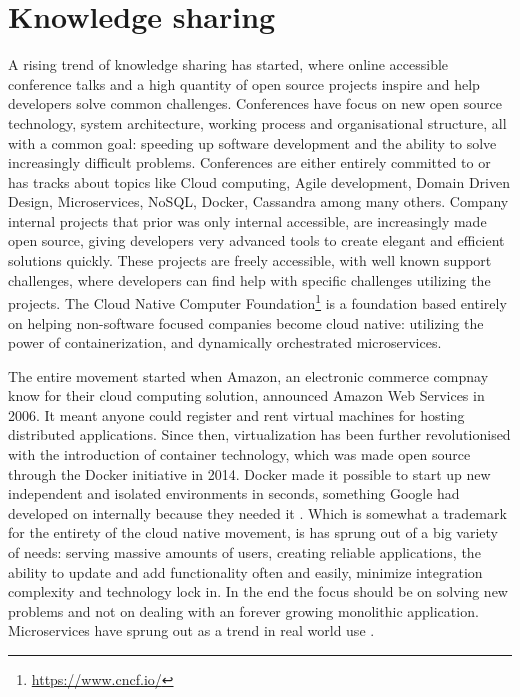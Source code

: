 \section{Knowledge sharing}
A rising trend of knowledge sharing has started, where online accessible conference talks and a high quantity of open source projects inspire and help developers solve common challenges. Conferences have focus on new open source technology, system architecture, working process and organisational structure, all with a common goal: speeding up software development and the ability to solve increasingly difficult problems. Conferences are either entirely committed to or has tracks about topics like Cloud computing, Agile development, Domain Driven Design, Microservices, NoSQL, Docker, Cassandra among many others\cite{george2016it}. Company internal projects that prior was only internal accessible, are increasingly made open source, giving developers very advanced tools to create elegant and efficient solutions quickly. These projects are freely accessible, with well known support challenges, where developers can find help with specific challenges utilizing the projects. The Cloud Native Computer Foundation\footnote{\url{https://www.cncf.io/}} is a foundation based entirely on helping non-software focused companies become cloud native: utilizing the power of containerization, and dynamically orchestrated microservices.

The entire movement started when Amazon, an electronic commerce compnay know for their cloud computing solution, announced Amazon Web Services in 2006. It meant anyone could register and rent virtual machines for hosting distributed applications. Since then, virtualization has been further revolutionised with the introduction of container technology, which was made open source through the Docker initiative in 2014. Docker made it possible to start up new independent and isolated environments in seconds, something Google had developed on internally because they needed it \cite{bernstein2014containers}. Which is somewhat a trademark for the entirety of the cloud native movement, is has sprung out of a big variety of needs: serving massive amounts of users, creating reliable applications, the ability to update and add functionality often and easily, minimize integration complexity and technology lock in. In the end the focus should be on solving new problems and not on dealing with an forever growing monolithic application. Microservices have sprung out as a trend in real world use \cite[p.~1]{newman2015microservices}.

